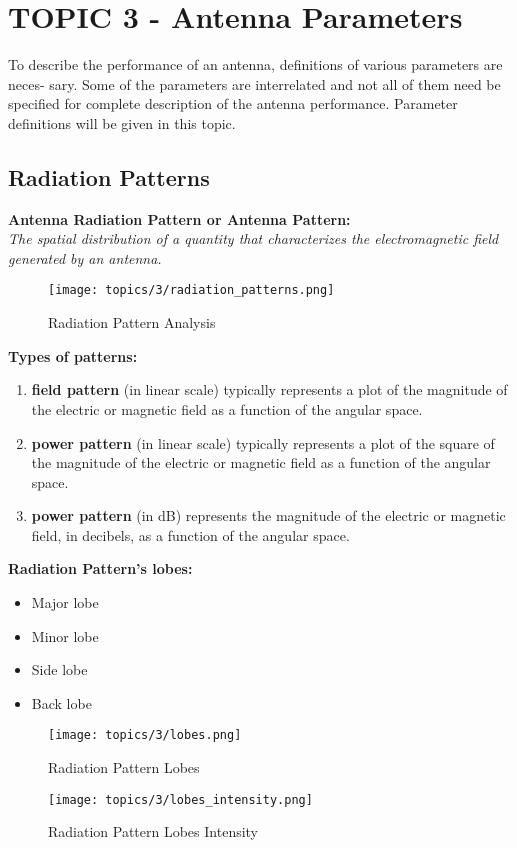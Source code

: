 \documentclass[class=article, crop=false]{standalone}
\begin{document}
    \section{TOPIC 3 - Antenna Parameters}
    To describe the performance of an antenna, definitions of various parameters are neces-
    sary. Some of the parameters are interrelated and not all of them need be specified for
    complete description of the antenna performance. Parameter definitions will be given
    in this topic.\cite{BALANIS} \\

    \subsection{Radiation Patterns}
    \textbf{Antenna Radiation Pattern or Antenna Pattern:}\\
    \emph{The spatial distribution of a quantity that
    characterizes the electromagnetic field generated by an antenna.}

    \begin{figure}[h!]
        \texttt{[image: topics/3/radiation\_patterns.png]}
        \caption{Radiation Pattern Analysis \cite{BALANIS}}
        \label{fig:radiationpattern}
    \end{figure}

    \textbf{Types of patterns: }\\
    \cite{BALANIS}
    \begin{enumerate}
        \item \textbf{field pattern} (in linear scale) typically represents a plot of the magnitude of the
        electric or magnetic field as a function of the angular space.
        \item \textbf{power pattern} (in linear scale) typically represents a plot of the square of the
        magnitude of the electric or magnetic field as a function of the angular space.
        \item \textbf{power pattern} (in dB) represents the magnitude of the electric or magnetic field,
        in decibels, as a function of the angular space.
    \end{enumerate}

    \textbf{
        Radiation Pattern's lobes:
    }
    \begin{itemize}
        \item Major lobe
        \item Minor lobe
        \item Side lobe
        \item Back lobe
    \end{itemize}
    \begin{figure}[h!]
        \texttt{[image: topics/3/lobes.png]}
        \caption{Radiation Pattern Lobes \cite{BALANIS}}
        \label{fig:lobes}
    \end{figure}
    \begin{figure}[h!]
        \texttt{[image: topics/3/lobes\_intensity.png]}
        \caption{Radiation Pattern Lobes Intensity \cite{BALANIS}}
        \label{fig:lobes_intensity}
    \end{figure}
\end{document}
